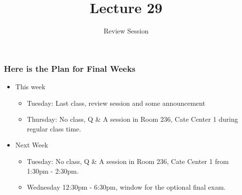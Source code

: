\documentclass[12pt]{beamer}
\title[ECON2843]{Lecture 29}
\subtitle{Review Session}
\date{}
\begin{document}
	\begin{frame}
		\titlepage
		
	\end{frame}
	\begin{frame}
		\frametitle{Here is the Plan for Final Weeks}
		\begin{itemize}[label={\color{blue}$\blacktriangleright$}]
			\item This week
			\begin{itemize}[label={\color{blue}$\blacktriangleright$}]
			\item Tuesday: Last class, review session and some announcement
			\item Thursday: No class, Q \& A session in Room 236, Cate Center 1 during regular class time.
			\end{itemize}
			\item Next Week
			\begin{itemize}[label={\color{blue}$\blacktriangleright$}]
				\item Tuesday: No class, Q \& A session in Room 236, Cate Center 1 from 1:30pm - 2:30pm.
				\item Wednesday 12:30pm - 6:30pm, window for the optional final exam.
			\end{itemize}
				\end{itemize}

	\end{frame}
	
\end{document}
